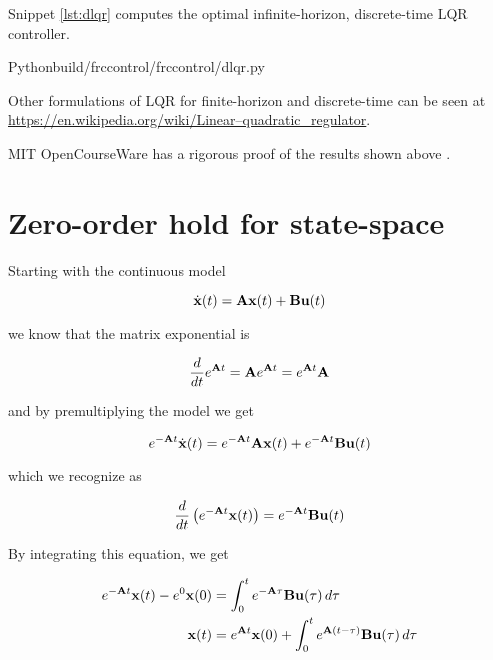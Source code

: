 Snippet \ref{lst:dlqr} computes the optimal infinite-horizon, discrete-time
LQR controller.

\begin{code}{Python}{build/frccontrol/frccontrol/dlqr.py}
  \caption{Infinite-horizon, discrete-time LQR computation in Python}
  \label{lst:dlqr}
\end{code}

Other formulations of LQR for finite-horizon and discrete-time can be seen at
\url{https://en.wikipedia.org/wiki/Linear–quadratic_regulator}.

MIT OpenCourseWare has a rigorous proof of the results shown above
\cite{bib:lqr-derivs}.

\section{Zero-order hold for state-space}
\label{sec:deriv-zoh-ss}

Starting with the continuous model

\begin{equation*}
  \dot{\mathbf{x}}(t) = \mathbf{A}\mathbf{x}(t) + \mathbf{B}\mathbf{u}(t)
\end{equation*}

we know that the matrix exponential is

\begin{equation*}
  \frac{d}{dt}e^{\mathbf{A}t} = \mathbf{A}e^{\mathbf{A}t} = e^{\mathbf{A}t}\mathbf{A}
\end{equation*}

and by premultiplying the model we get

\begin{equation*}
  e^{-\mathbf{A}t}\dot{\mathbf{x}}(t) = e^{-\mathbf{A}t}\mathbf{A}\mathbf{x}(t) +
    e^{-\mathbf{A}t}\mathbf{B}\mathbf{u}(t)
\end{equation*}

which we recognize as

\begin{equation*}
  \frac{d}{dt}\left(e^{-\mathbf{A}t}\mathbf{x}(t)\right) =
    e^{-\mathbf{A}t}\mathbf{B}\mathbf{u}(t)
\end{equation*}

By integrating this equation, we get

\begin{align*}
  e^{-\mathbf{A}t}\mathbf{x}(t) - e^0\mathbf{x}(0) &=
    \int_0^t e^{-\mathbf{A}\tau}\mathbf{B}\mathbf{u}(\tau) \,d\tau \\
  \mathbf{x}(t) &= e^{\mathbf{A}t}\mathbf{x}(0) +
    \int_0^t e^{\mathbf{A}(t - \tau)}\mathbf{B}\mathbf{u}(\tau) \,d\tau
\end{align*}

